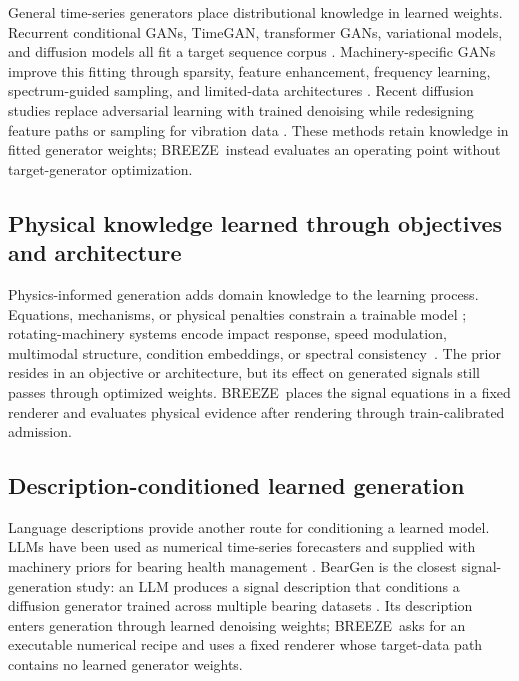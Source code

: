 \documentclass[a4paper,fleqn]{cas-sc}
\newcommand{\breeze}{BREEZE}
\begin{document}
General time-series generators place distributional knowledge in learned
weights. Recurrent conditional GANs, TimeGAN, transformer GANs, variational
models, and diffusion models all fit a target sequence corpus
\citep{esteban2017rcgan,yoon2019timegan,li2022ttsgan,li2022ttscgan,
liao2020sigcwgan,desai2021timevae,nichol2021improved,tashiro2021csdi,
alcaraz2022sssd,rasul2021timegrad}. Machinery-specific GANs
improve this fitting through sparsity, feature enhancement, frequency learning,
spectrum-guided sampling, and limited-data architectures
\citep{ma2021scgan,liu2022dfegan,ko2023flgn,kim2024sgan,lin2025fillinggan}.
Recent diffusion studies replace adversarial learning with trained denoising
while redesigning feature paths or sampling for vibration data
\citep{yi2024tsdm,yu2024refddpm,yang2024ddpmaugmentation,
xu2025faultdiffusion,tong2026acsdm}. These methods retain knowledge in fitted
generator weights; \breeze\ instead evaluates an operating point without
target-generator optimization.

\subsection{Physical knowledge learned through objectives and architecture}

Physics-informed generation adds domain knowledge to the learning process.
Equations, mechanisms, or physical penalties constrain a trainable model
\citep{raissi2019pinn}; rotating-machinery systems encode impact response,
speed modulation, multimodal structure, condition embeddings, or spectral
consistency~\citep{gao2025physicsgan,liu2026physicsdiffusion,guo2025diffucd,
xu2026mrddim}. The prior resides in an objective or architecture, but its effect
on generated signals still passes through optimized weights. \breeze\ places
the signal equations in a fixed renderer and evaluates physical evidence after
rendering through train-calibrated admission.

\subsection{Description-conditioned learned generation}

Language descriptions provide another route for conditioning a learned model.
LLMs have been used as numerical time-series forecasters and supplied with
machinery priors for bearing health management
\citep{gruver2023llmtime,peng2025bearllm}. BearGen is the closest
signal-generation study: an LLM produces a signal description that conditions
a diffusion generator trained across multiple bearing datasets
\citep{lee2026beargen}. Its description enters generation through learned
denoising weights; \breeze\ asks for an executable numerical recipe and uses a
fixed renderer whose target-data path contains no learned generator weights.
\end{document}

